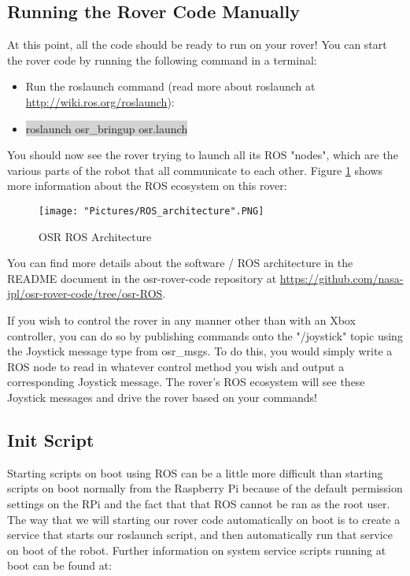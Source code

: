 \documentclass{article}
\begin{document}
\subsection{Running the Rover Code Manually}
At this point, all the code should be ready to run on your rover!  You can start the rover code by running the following command in a terminal:
\begin{itemize}
	\item[] Run the roslaunch command (read more about roslaunch at \href{http://wiki.ros.org/roslaunch}{http://wiki.ros.org/roslaunch}):
	\item[] \colorbox{lightgray}{roslaunch osr\_bringup osr.launch}
\end{itemize}

\noindent You should now see the rover trying to launch all its ROS "nodes", which are the various parts of the robot that all communicate to each other.  Figure \ref{ros architecture} shows more information about the ROS ecosystem on this rover:
\begin{figure}[H]
	\centering
	\texttt{[image: "Pictures/ROS\_architecture".PNG]}
	\caption{OSR ROS Architecture}
	\label{ros architecture}
\end{figure}

You can find more details about the software / ROS architecture in the README document in the osr-rover-code repository at \href{https://github.com/nasa-jpl/osr-rover-code/tree/osr-ROS}{https://github.com/nasa-jpl/osr-rover-code/tree/osr-ROS}.

\bigskip 

\noindent If you wish to control the rover in any manner other than with an Xbox controller, you can do so by publishing commands onto the "/joystick" topic using the Joystick message type from osr\_msgs. To do this, you would simply write a ROS node to read in whatever control method you wish and output a corresponding Joystick message. The rover's ROS ecosystem will see these Joystick messages and drive the rover based on your commands!

\subsection{Init Script}

Starting scripts on boot using ROS can be a little more difficult than starting scripts on boot normally from the Raspberry Pi because of the default permission settings on the RPi and the fact that that ROS cannot be ran as the root user. The way that we will starting our rover code automatically on boot is to create a service that starts our roslaunch script, and then automatically run that service on boot of the robot. Further information on system service scripts running at boot can be found at: 
\end{document}
